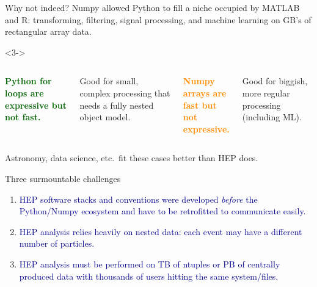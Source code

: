 \documentclass[aspectratio=169]{beamer}
\begin{document}
\begin{frame}{Why not indeed?}
\vspace{0.5 cm}
Numpy allowed Python to fill a niche occupied by MATLAB and R: transforming, filtering, signal processing, and machine learning on GB's of rectangular array data.

\vspace{0.5 cm}

\vspace{0.75 cm}
\begin{uncoverenv}<3->
\begin{columns}[t]

\textcolor{darkgreen}{\bf Python for loops are expressive but not fast.}

\vspace{0.25 cm}
Good for small, complex processing that needs a fully nested object model.

\textcolor{darkorange}{\bf Numpy arrays are \\ fast but not expressive.}

\vspace{0.25 cm}
Good for biggish, more regular processing (including ML).

\end{columns}

\vspace{0.75 cm}
Astronomy, data science, etc.\ fit these cases better than HEP does.
\end{uncoverenv}
\end{frame}

\begin{frame}{Three surmountable challenges}
\large
\vspace{0.5 cm}
\begin{center}
\begin{minipage}{0.75\linewidth}
\begin{enumerate}\setlength{\itemsep}{1 cm}
\item \textcolor{darkblue}{HEP software stacks and conventions were developed {\it before} the Python/Numpy ecosystem and have to be retrofitted to communicate easily.}

\item \textcolor{darkblue}{HEP analysis relies heavily on nested data: each event may have a different number of particles.}

\item \textcolor{darkblue}{HEP analysis must be performed on TB of ntuples or PB of centrally produced data with thousands of users hitting the same system/files.}
\end{enumerate}
\end{minipage}\mbox{\hspace{1 cm}}
\end{center}
\end{frame}
\end{document}
